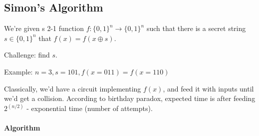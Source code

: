\documentclass{scrartcl}
\begin{document}
\subsection{Simon's Algorithm}
\label{sec:SimonAlg}

We're given s 2-1 function $f: \{0, 1\}^n \to \{0, 1\}^n$ such that there is a
secret string $s \in \{0, 1\}^n$ that $f(x) = f(x \oplus s)$.

Challenge: find $s$.

Example: $n = 3, s = 101, f(x=011) = f(x=110)$

Classically, we'd have a circuit implementing $f(x)$, and feed it with inputs
until we'd get a collision. According to birthday paradox, expected time is
after feeding $2^{(n/2)}$ - exponential time (number of attempts).

\paragraph{Algorithm}
\end{document}
